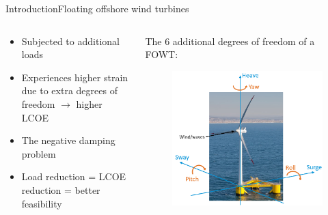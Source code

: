 \begin{frame}{Introduction}{Floating offshore wind turbines}
	\begin{columns}
		\begin{column}{.49\textwidth}
			\begin{itemize}
				\item Subjected to additional loads
				\item Experiences higher strain due to extra degrees of freedom $ \rightarrow $ higher LCOE
				\item The negative damping problem
				\item Load reduction = LCOE reduction = better feasibility
			\end{itemize}
		\end{column}
		
		\begin{column}{.49\textwidth}
			The 6 additional degrees of freedom of a FOWT:
			\begin{figure}[ht]
				\centering
				\includegraphics[width=1\linewidth]{../Graphics/FOWTcoordinates.png}
				\label{fig:fowt_coordinates}
			\end{figure}	
		\end{column}
	\end{columns}
\end{frame}


%



